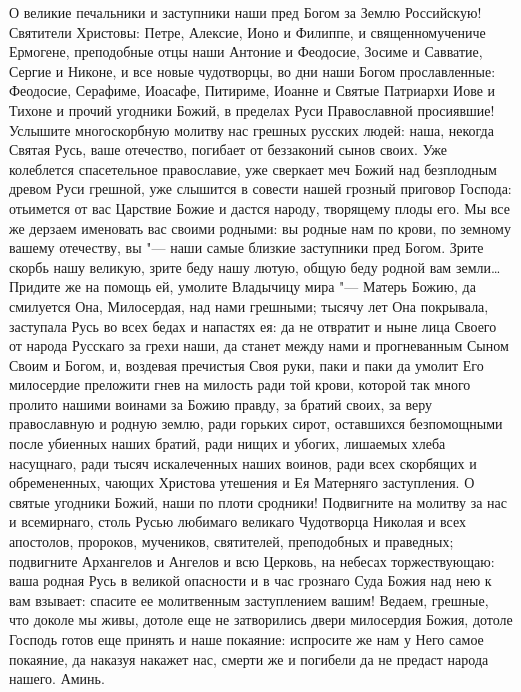 О великие печальники и заступники наши пред Богом за Землю Российскую! Святители Христовы: Петре, Алексие, Ионо и Филиппе, и священномучениче Ермогене, преподобные отцы наши Антоние и Феодосие, Зосиме и Савватие, Сергие и Никоне, и все новые чудотворцы, во дни наши Богом прославленные: Феодосие, Серафиме, Иоасафе, Питириме, Иоанне и Святые Патриархи Иове и Тихоне и прочий угодники Божий, в пределах Руси Православной просиявшие! Услышите многоскорбную молитву нас грешных русских людей: наша, некогда Святая Русь, ваше отечество, погибает от беззаконий сынов своих. Уже колеблется спасетельное православие, уже сверкает меч Божий над безплодным древом Руси грешной, уже слышится в совести нашей грозный приговор Господа: отьимется от вас Царствие Божие и дастся народу, творящему плоды его. Мы все же дерзаем именовать вас своими родными: вы родные нам по крови, по земному вашему отечеству, вы "--- наши самые близкие заступники пред Богом. Зрите скорбь нашу великую, зрите беду нашу лютую, общую беду родной вам земли… Придите же на помощь ей, умолите Владычицу мира "--- Матерь Божию, да смилуется Она, Милосердая, над нами грешными; тысячу лет Она покрывала, заступала Русь во всех бедах и напастях ея: да не отвратит и ныне лица Своего от народа Русскаго за грехи наши, да станет между нами и прогневанным Сыном Своим и Богом, и, воздевая пречистыя Своя руки, паки и паки да умолит Его милосердие преложити гнев на милость ради той крови, которой так много пролито нашими воинами за Божию правду, за братий своих, за веру православную и родную землю, ради горьких сирот, оставшихся безпомощными после убиенных наших братий, ради нищих и убогих, лишаемых хлеба насущнаго, ради тысяч искалеченных наших воинов, ради всех скорбящих и обремененных, чающих Христова утешения и Ея Матерняго заступления. О святые угодники Божий, наши по плоти сродники! Подвигните на молитву за нас и всемирнаго, столь Русью любимаго великаго Чудотворца Николая и всех апостолов, пророков, мучеников, святителей, преподобных и праведных; подвигните Архангелов и Ангелов и всю Церковь, на небесах торжествующаю: ваша родная Русь в великой опасности и в час грознаго Суда Божия над нею к вам взывает: спасите ее молитвенным заступлением вашим! Ведаем, грешные, что доколе мы живы, дотоле еще не затворились двери милосердия Божия, дотоле Господь готов еще принять и наше покаяние: испросите же нам у Него самое покаяние, да наказуя накажет нас, смерти же и погибели да не предаст народа нашего. Аминь.
\longpage{}\mychapterending

 
